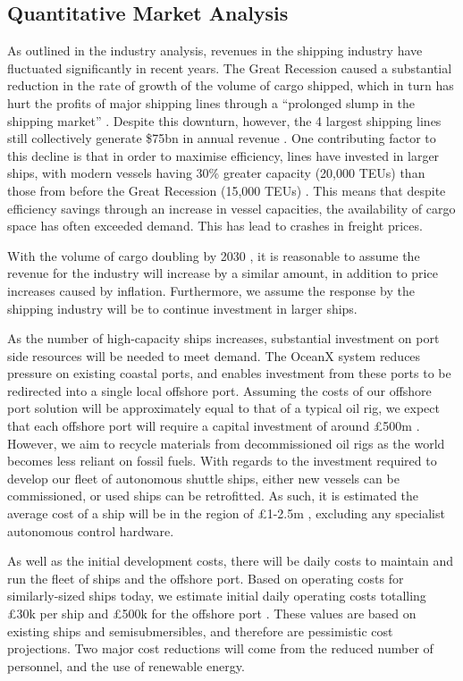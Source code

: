 \subsection{Quantitative Market Analysis}

As outlined in the industry analysis, revenues in the shipping industry have fluctuated significantly in recent years. The Great Recession caused a substantial reduction in the rate of growth of the volume of cargo shipped, which in turn has hurt the profits of major shipping lines through a “prolonged slump in the shipping market” \cite{ShippingSlump}. Despite this downturn, however, the 4 largest shipping lines still collectively generate \$75bn in annual revenue \cite{TroubledWaters}. One contributing factor to this decline is that in order to maximise efficiency, lines have invested in larger ships, with modern vessels having 30\% greater capacity (20,000 TEUs) than those from before the Great Recession (15,000 TEUs) \cite{ftarticle}. This means that despite efficiency savings through an increase in vessel capacities, the availability of cargo space has often exceeded demand. This has lead to crashes in freight prices.

With the volume of cargo doubling by 2030 \cite{BluePlanet}, it is reasonable to assume the revenue for the industry will increase by a similar amount, in addition to price increases caused by inflation. Furthermore, we assume the response by the shipping industry will be to continue investment in larger ships.

As the number of high-capacity ships increases, substantial investment on port side resources will be needed to meet demand. The OceanX system reduces pressure on existing coastal ports, and enables investment from these ports to be redirected into a single local offshore port. Assuming the costs of our offshore port solution will be approximately equal to that of a typical oil rig, we expect that each offshore port will require a capital investment of around £500m \cite{MaerskRigs}. However, we aim to recycle materials from decommissioned oil rigs as the world becomes less reliant on fossil fuels. With regards to the investment required to  develop our fleet of autonomous shuttle ships, either new vessels can be commissioned, or used ships can be retrofitted. As such, it is estimated the average cost of a ship will be in the region of £1-2.5m \cite{forsale}, excluding any specialist autonomous control hardware.

As well as the initial development costs, there will be daily costs to maintain and run the fleet of ships and the offshore port. Based on operating costs for similarly-sized ships today, we estimate initial daily operating costs totalling £30k per ship \cite{DailyOperatingCostsShips} and £500k for the offshore port \cite{DailyOperatingCostsOilRig}. These values are based on existing ships and semisubmersibles, and therefore are pessimistic cost projections. Two major cost reductions will come from the reduced number of personnel, and the use of renewable energy.

